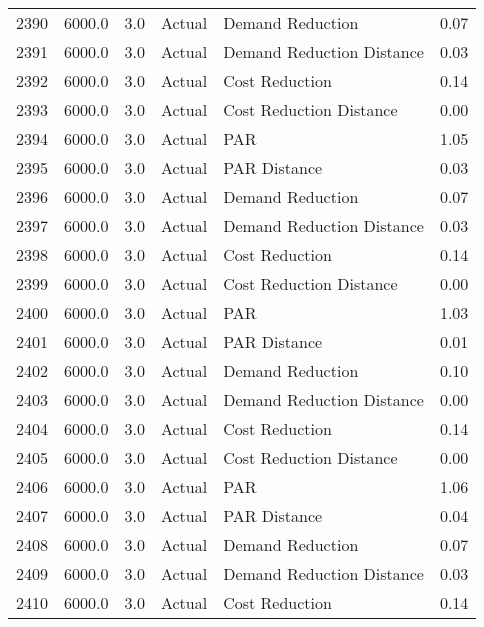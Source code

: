 \begin{longtable}{lrrllr}
2390 &       6000.0 &     3.0 &         Actual &           Demand Reduction &   0.07 \\
2391 &       6000.0 &     3.0 &         Actual &  Demand Reduction Distance &   0.03 \\
2392 &       6000.0 &     3.0 &         Actual &             Cost Reduction &   0.14 \\
2393 &       6000.0 &     3.0 &         Actual &    Cost Reduction Distance &   0.00 \\
2394 &       6000.0 &     3.0 &         Actual &                        PAR &   1.05 \\
2395 &       6000.0 &     3.0 &         Actual &               PAR Distance &   0.03 \\
2396 &       6000.0 &     3.0 &         Actual &           Demand Reduction &   0.07 \\
2397 &       6000.0 &     3.0 &         Actual &  Demand Reduction Distance &   0.03 \\
2398 &       6000.0 &     3.0 &         Actual &             Cost Reduction &   0.14 \\
2399 &       6000.0 &     3.0 &         Actual &    Cost Reduction Distance &   0.00 \\
2400 &       6000.0 &     3.0 &         Actual &                        PAR &   1.03 \\
2401 &       6000.0 &     3.0 &         Actual &               PAR Distance &   0.01 \\
2402 &       6000.0 &     3.0 &         Actual &           Demand Reduction &   0.10 \\
2403 &       6000.0 &     3.0 &         Actual &  Demand Reduction Distance &   0.00 \\
2404 &       6000.0 &     3.0 &         Actual &             Cost Reduction &   0.14 \\
2405 &       6000.0 &     3.0 &         Actual &    Cost Reduction Distance &   0.00 \\
2406 &       6000.0 &     3.0 &         Actual &                        PAR &   1.06 \\
2407 &       6000.0 &     3.0 &         Actual &               PAR Distance &   0.04 \\
2408 &       6000.0 &     3.0 &         Actual &           Demand Reduction &   0.07 \\
2409 &       6000.0 &     3.0 &         Actual &  Demand Reduction Distance &   0.03 \\
2410 &       6000.0 &     3.0 &         Actual &             Cost Reduction &   0.14 \\

\end{longtable}
